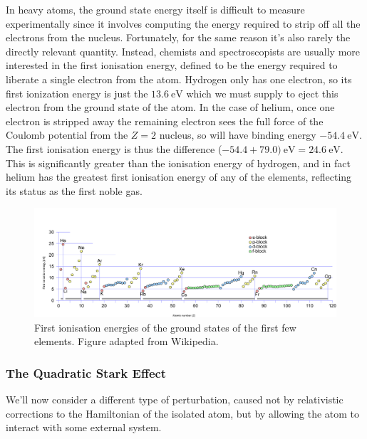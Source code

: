 \documentclass{article}
\theoremstyle{plain}\theoremheaderfont{\normalfont\itshape}\theorembodyfont{\rmfamily}\theoremseparator{.}\newtheorem*{rem}{Remark}\newtheorem*{ex}{Example}\newtheorem*{proof}{Proof}\newtheorem*{altp}{Alternative proof}
\theoremstyle{plain}\theoremheaderfont{\normalfont\bfseries}\theorembodyfont{\rmfamily}\theoremseparator{.}\newtheorem{thm}{Theorem}[section]\newtheorem{lem}[thm]{Lemma}\newtheorem{prop}[thm]{Proposition}\newtheorem*{cor}{Corollary}\newtheorem{defn}[thm]{Definition}\newtheorem{clm}[thm]{Claim}\newtheorem{clminproof}{Claim}
\theoremstyle{break}\theoremheaderfont{\normalfont\itshape}\theorembodyfont{\rmfamily}\theoremseparator{.\medskip}\newtheorem*{proofskip}{Proof}\newtheorem*{exs}{Examples}\newtheorem*{rems}{Remarks}
\theoremstyle{break}\theoremheaderfont{\normalfont\bfseries}\theorembodyfont{\rmfamily}\theoremseparator{.\medskip}\newtheorem{lemskip}[thm]{Lemma}\newtheorem{defnskip}[thm]{Definition}\newtheorem{propskip}[thm]{Proposition}\newtheorem{thmskip}[thm]{Theorem}
\numberwithin{equation}{section}
\newcommand{\unit}[1]{\ \mathrm{#1}}
\begin{document}
    In heavy atoms, the ground state energy itself is difficult to measure experimentally since it involves computing the energy required to strip off all the electrons from the nucleus. Fortunately, for the same reason it's also rarely the directly relevant quantity. Instead, chemists and spectroscopists are usually more interested in the first ionisation energy, defined to be the energy required to liberate a single electron from the atom. Hydrogen only has one electron, so its first ionization energy is just the \(13.6\unit{eV}\) which we must supply to eject this electron from the ground state of the atom. In the case of helium, once one electron is stripped away the remaining electron sees the full force of the Coulomb potential from the \(Z=2\) nucleus, so will have binding energy \(-54.4\unit{eV}\). The first ionisation energy is thus the difference (\(-54.4+79.0)\unit{eV}=24.6\unit{eV}\). This is significantly greater than the ionisation energy of hydrogen, and in fact helium has the greatest first ionisation energy of any of the elements, reflecting its status as the first noble gas.

    \begin{figure}
        \centering
        \includegraphics[width=\textwidth]{IE.png}
        \caption{First ionisation energies of the ground states of the first few elements. Figure adapted from Wikipedia.}
    \end{figure}

    \subsubsection{The Quadratic Stark Effect}
    We'll now consider a different type of perturbation, caused not by relativistic corrections to the Hamiltonian of the isolated atom, but by allowing the atom to interact with some external system.
\end{document}
